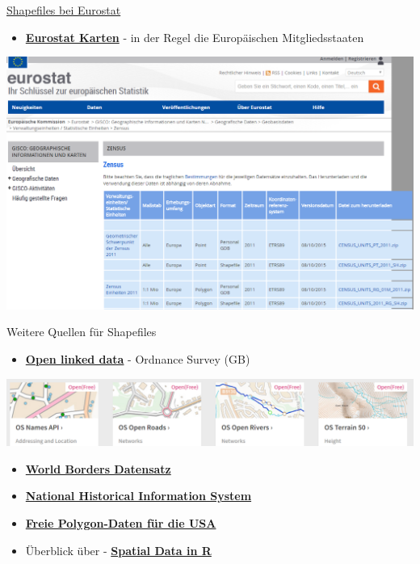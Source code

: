 \documentclass[ignorenonframetext,]{beamer}
\providecommand{\tightlist}{%
  \setlength{\itemsep}{0pt}\setlength{\parskip}{0pt}}
\begin{document}
\begin{frame}{\href{http://ec.europa.eu/eurostat/de/web/gisco/geodata/reference-data/administrative-units-statistical-units}{Shapefiles
bei Eurostat}}
\protect\hypertarget{shapefiles-bei-eurostat}{}

\begin{itemize}
\tightlist
\item
  \href{http://epp.eurostat.ec.europa.eu/portal/page/portal/gisco_Geographical_information_maps/popups/\%20references/administrative_units_statistical_units_1}{\textbf{Eurostat
  Karten}} - in der Regel die Europäischen Mitgliedsstaaten
\end{itemize}

\includegraphics{figure/Eurostat_Zensus.PNG}

\end{frame}

\begin{frame}{Weitere Quellen für Shapefiles}
\protect\hypertarget{weitere-quellen-fur-shapefiles}{}

\begin{itemize}
\tightlist
\item
  \href{https://www.ordnancesurvey.co.uk/business-and-government/products/opendata-products-grid.html}{\textbf{Open
  linked data}} - Ordnance Survey (GB)
\end{itemize}

\includegraphics{figure/OpenLinkedData.PNG}

\begin{itemize}
\item
  \href{http://thematicmapping.org/downloads/world_borders.php}{\textbf{World
  Borders Datensatz}}
\item
  \href{https://www.nhgis.org/}{\textbf{National Historical Information
  System}}
\item
  \href{http://www.freemapdata.com/html/free_polygon_data.html}{\textbf{Freie
  Polygon-Daten für die USA}}
\item
  Überblick über -
  \href{https://science.nature.nps.gov/im/datamgmt/statistics/r/advanced/spatial.cfm}{\textbf{Spatial
  Data in R}}
\end{itemize}

\end{frame}
\end{document}
